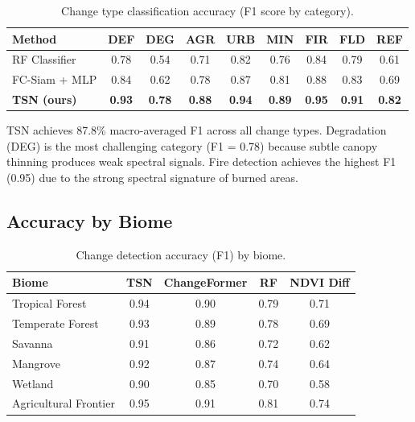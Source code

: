 \begin{table}[H]
\centering
\caption{Change type classification accuracy (F1 score by category).}
\label{tab:classification}
\begin{tabular}{@{}lcccccccc@{}}
\toprule
\textbf{Method} & \textbf{DEF} & \textbf{DEG} & \textbf{AGR} & \textbf{URB} & \textbf{MIN} & \textbf{FIR} & \textbf{FLD} & \textbf{REF} \\
\midrule
RF Classifier & 0.78 & 0.54 & 0.71 & 0.82 & 0.76 & 0.84 & 0.79 & 0.61 \\
FC-Siam + MLP & 0.84 & 0.62 & 0.78 & 0.87 & 0.81 & 0.88 & 0.83 & 0.69 \\
\textbf{TSN (ours)} & \textbf{0.93} & \textbf{0.78} & \textbf{0.88} & \textbf{0.94} & \textbf{0.89} & \textbf{0.95} & \textbf{0.91} & \textbf{0.82} \\
\bottomrule
\end{tabular}
\end{table}

TSN achieves 87.8\% macro-averaged F1 across all change types.
Degradation (DEG) is the most challenging category (F1 = 0.78) because subtle canopy thinning produces weak spectral signals.
Fire detection achieves the highest F1 (0.95) due to the strong spectral signature of burned areas.

\subsection{Accuracy by Biome}

\begin{table}[H]
\centering
\caption{Change detection accuracy (F1) by biome.}
\label{tab:biome_accuracy}
\begin{tabular}{@{}lcccc@{}}
\toprule
\textbf{Biome} & \textbf{TSN} & \textbf{ChangeFormer} & \textbf{RF} & \textbf{NDVI Diff} \\
\midrule
Tropical Forest & 0.94 & 0.90 & 0.79 & 0.71 \\
Temperate Forest & 0.93 & 0.89 & 0.78 & 0.69 \\
Savanna & 0.91 & 0.86 & 0.72 & 0.62 \\
Mangrove & 0.92 & 0.87 & 0.74 & 0.64 \\
Wetland & 0.90 & 0.85 & 0.70 & 0.58 \\
Agricultural Frontier & 0.95 & 0.91 & 0.81 & 0.74 \\
\bottomrule
\end{tabular}
\end{table}

